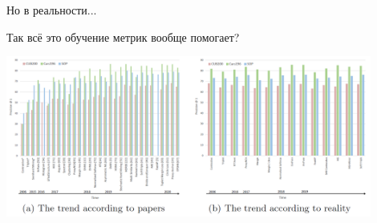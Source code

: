 \begin{frame}{Но в реальности...}

Так всё это обучение метрик вообще помогает?

\begin{center}
    \includegraphics[width=0.9\textwidth]{images/reality check.png}
\end{center}
\end{frame}

